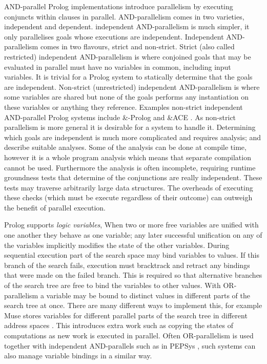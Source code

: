 AND-parallel Prolog implementations introduce parallelism by executing
conjuncts within clauses in parallel.
AND-parallelism comes in two varieties, independent and dependent.
independent AND-parallelism is much simpler, it only parallelises goals
whose executions are independent.
Independent AND-parallelism comes in two flavours, strict and non-strict.
Strict (also called restricted) independent AND-parallelism is where
conjoined goals that may be evaluated in parallel must have no variables in
common, including input variables.
It is trivial for a Prolog system to statically determine that the goals are
independent.
Non-strict (unrestricted) independent AND-parallelism is where some variables
are shared but none of the goals performs any instantiation on these variables
or anything they reference.
Examples non-strict independent AND-parallel Prolog systems include \&-Prolog
\citep*{Hermenegildo:1991:and-parallel,
DBLP:journals/jlp/MuthukumarBBH99}
and \&ACE \citep{gupta:1991:ace}.
As non-strict parallelism is more general it is desirable for a system to
handle it.
Determining which goals are independent is much more complicated and
requires analysis;
\citet*{DBLP:journals/tcs/GrasH09} and \citet*{Hermenegildo1995} describe
suitable analyses.
Some of the analysis can be done at compile time,
however it is a whole program analysis which means that separate compilation
cannot be used.
Furthermore the analysis is often incomplete,
requiring runtime groundness tests that determine of the conjunctions are
really independent.
These tests may traverse arbitrarily large data structures.
The overheads of executing these checks
(which must be execute regardless of their outcome)
can outweigh the benefit of parallel execution.

Prolog supports \emph{logic variables},
When two or more free variables are unified with one another they behave as one
variable;
any later successful unification on any of the variables implicitly modifies
the state of the other variables.
During sequential execution
part of the search space may bind variables to values.
If this branch of the search fails,
execution must bracktrack and retract any bindings that were made on the
failed branch.
This is required so that alternative
branches of the search tree are free to bind the variables to other values.
With OR-parallelism a variable may be bound to distinct values in different
parts of the search tree at once.
There are many different ways to implement this,
for example Muse stores variables for different parallel parts of the search
tree in different address spaces \citep{ali:1990:muse}.
This introduces extra work such as copying the states of computations as new
work is executed in parallel.
Often OR-parallelism is used together with independent AND-parallels
such as in PEPSys \citep*{baron:1988:pepsys},
such systems can also manage variable bindings in a similar way.

